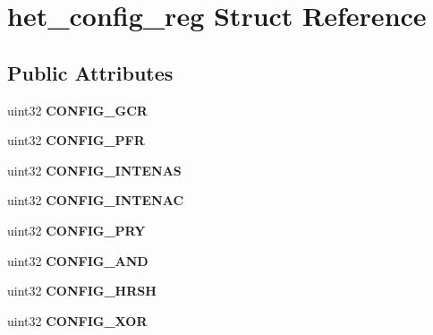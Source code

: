 \hypertarget{structhet__config__reg}{}\section{het\+\_\+config\+\_\+reg Struct Reference}
\label{structhet__config__reg}
\subsection*{Public Attributes}
\begin{DoxyCompactItemize}
\item 
\mbox{\label{structhet__config__reg_aca4422a0969662976155459f1efa8aa8}} 
uint32 {\bfseries C\+O\+N\+F\+I\+G\+\_\+\+G\+CR}
\item 
\mbox{\label{structhet__config__reg_a9536a944122a7a3570437d4398668053}} 
uint32 {\bfseries C\+O\+N\+F\+I\+G\+\_\+\+P\+FR}
\item 
\mbox{\label{structhet__config__reg_a0e1251cf24ec6ee3dfa9edcdcdd86055}} 
uint32 {\bfseries C\+O\+N\+F\+I\+G\+\_\+\+I\+N\+T\+E\+N\+AS}
\item 
\mbox{\label{structhet__config__reg_a5d316ff18f38180ebc17526dc036f736}} 
uint32 {\bfseries C\+O\+N\+F\+I\+G\+\_\+\+I\+N\+T\+E\+N\+AC}
\item 
\mbox{\label{structhet__config__reg_a550d7eb653f031ce18b5b4288a1d79e7}} 
uint32 {\bfseries C\+O\+N\+F\+I\+G\+\_\+\+P\+RY}
\item 
\mbox{\label{structhet__config__reg_a85dec7e0562d3680811c464ac6d456ad}} 
uint32 {\bfseries C\+O\+N\+F\+I\+G\+\_\+\+A\+ND}
\item 
\mbox{\label{structhet__config__reg_a26e34055284ad1c5fdaf178d83bf8555}} 
uint32 {\bfseries C\+O\+N\+F\+I\+G\+\_\+\+H\+R\+SH}
\item 
\mbox{\label{structhet__config__reg_a694af97e3bfd9fbe32100ad2739bfdd6}} 
uint32 {\bfseries C\+O\+N\+F\+I\+G\+\_\+\+X\+OR}
\item 
\mbox{\label{structhet__config__reg_a1c7950fc0b7e1b384e615533597774fb}} 

\end{DoxyCompactItemize}

